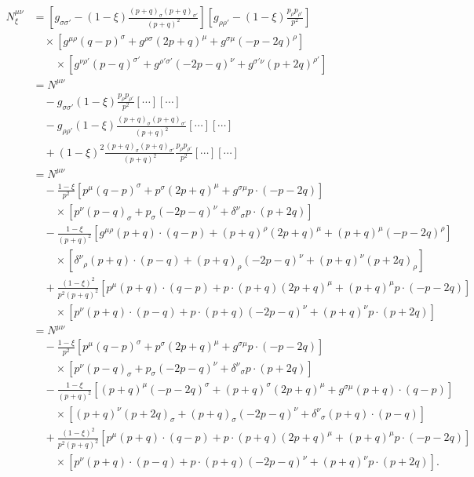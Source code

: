 \begin{align*}
  N^{\mu\nu}_\xi &=
  \left[ g_{\sigma\sigma'} - (1-\xi) \frac{(p+q)_\sigma (p+q)_{\sigma'}}{(p+q)^2} \right]
  \left[ g_{\rho\rho'} - (1-\xi) \frac{p_\rho p_{\rho'}}{p^2} \right] \\
  & \quad\times \left[ g^{\mu\rho} (q-p)^\sigma + g^{\rho\sigma} (2p+q)^\mu + g^{\sigma\mu} (-p-2q)^\rho \right] \\
  & \qquad\times \left[ g^{\nu\rho'} (p-q)^{\sigma'} + g^{\rho'\sigma'} (-2p-q)^\nu + g^{\sigma'\nu} (p+2q)^{\rho'} \right] \\
  &= N^{\mu\nu} \\
  & \quad - g_{\sigma\sigma'} (1-\xi) \frac{p_\rho p_{\rho'}}{p^2} [\cdots] [\cdots] \\
  & \quad - g_{\rho\rho'} (1-\xi) \frac{(p+q)_\sigma (p+q)_{\sigma'}}{(p+q)^2} [\cdots] [\cdots] \\
  & \quad + (1-\xi)^2 \frac{(p+q)_\sigma (p+q)_{\sigma'}}{(p+q)^2} \frac{p_\rho p_{\rho'}}{p^2} [\cdots] [\cdots] \\
  &= N^{\mu\nu} \\
  & \quad - \frac{1-\xi}{p^2} \left[ p^\mu (q-p)^\sigma + p^\sigma (2p+q)^\mu + g^{\sigma\mu} p \cdot (-p-2q) \right] \\
  & \qquad\times \left[ p^\nu (p-q)_\sigma + p_\sigma (-2p-q)^\nu + \delta^\nu{}_\sigma p \cdot (p+2q) \right] \\
  & \quad - \frac{1-\xi}{(p+q)^2} \left[ g^{\mu\rho} (p+q) \cdot (q-p) + (p+q)^\rho (2p+q)^\mu + (p+q)^\mu (-p-2q)^\rho \right] \\
  & \qquad\times \left[ \delta^\nu{}_\rho (p+q) \cdot (p-q) + (p+q)_\rho (-2p-q)^\nu + (p+q)^\nu (p+2q)_\rho \right] \\
  & \quad + \frac{(1-\xi)^2}{p^2(p+q)^2}
  \left[ p^\mu (p+q) \cdot (q-p) + p \cdot (p+q) (2p+q)^\mu + (p+q)^\mu p \cdot (-p-2q) \right] \\
  & \qquad\times \left[ p^\nu (p+q) \cdot (p-q) + p \cdot (p+q) (-2p-q)^\nu + (p+q)^\nu p \cdot (p+2q) \right] \\
  &= N^{\mu\nu} \\
  & \quad - \frac{1-\xi}{p^2} \left[ p^\mu (q-p)^\sigma + p^\sigma (2p+q)^\mu + g^{\sigma\mu} p \cdot (-p-2q) \right] \\
  & \qquad\times \left[ p^\nu (p-q)_\sigma + p_\sigma (-2p-q)^\nu + \delta^\nu{}_\sigma p \cdot (p+2q) \right] \\
  & \quad - \frac{1-\xi}{(p+q)^2} \left[ (p+q)^\mu (-p-2q)^\sigma + (p+q)^\sigma (2p+q)^\mu + g^{\sigma\mu} (p+q) \cdot (q-p) \right] \\
  & \qquad\times \left[ (p+q)^\nu (p+2q)_\sigma + (p+q)_\sigma (-2p-q)^\nu + \delta^\nu{}_\sigma (p+q) \cdot (p-q) \right] \\
  & \quad + \frac{(1-\xi)^2}{p^2(p+q)^2}
  \left[ p^\mu (p+q) \cdot (q-p) + p \cdot (p+q) (2p+q)^\mu + (p+q)^\mu p \cdot (-p-2q) \right] \\
  & \qquad\times \left[ p^\nu (p+q) \cdot (p-q) + p \cdot (p+q) (-2p-q)^\nu + (p+q)^\nu p \cdot (p+2q) \right] .
\end{align*}
